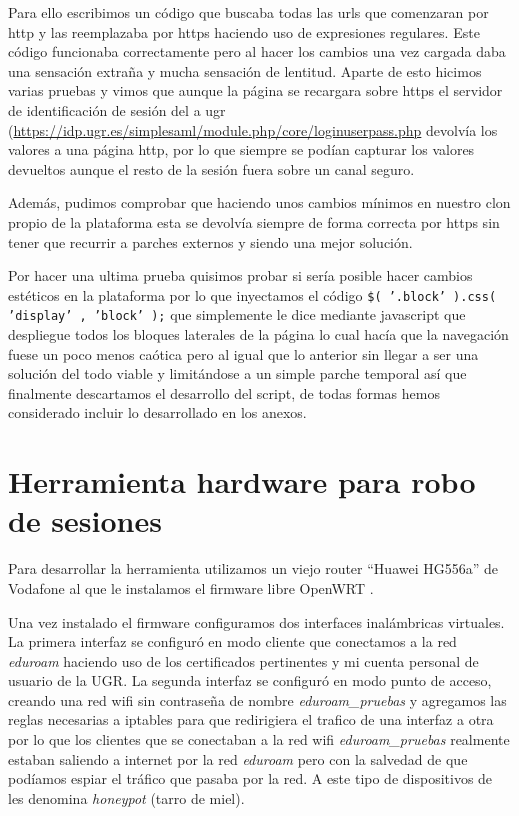 \bigskip
Para ello escribimos un código que buscaba todas las urls que comenzaran por http y las reemplazaba por https haciendo uso de expresiones regulares. Este código funcionaba correctamente pero al hacer los cambios una vez cargada daba una sensación extraña y mucha sensación de lentitud. Aparte de esto hicimos varias pruebas y vimos que aunque la página se recargara sobre https el servidor de identificación de sesión del a ugr (\url{https://idp.ugr.es/simplesaml/module.php/core/loginuserpass.php} devolvía los valores a una página http, por lo que siempre se podían capturar los valores devueltos aunque el resto de la sesión fuera sobre un canal seguro.

\bigskip
Además, pudimos comprobar que haciendo unos cambios mínimos en nuestro clon propio de la plataforma esta se devolvía siempre de forma correcta por https sin tener que recurrir a parches externos y siendo una mejor solución.

\bigskip
Por hacer una ultima prueba quisimos probar si sería posible hacer cambios estéticos en la plataforma por lo que inyectamos el código \texttt{\$( '.block' ).css( 'display' , 'block' );} que simplemente le dice mediante javascript que despliegue todos los bloques laterales de la página lo cual hacía que la navegación fuese un poco menos caótica pero al igual que lo anterior sin llegar a ser una solución del todo viable y limitándose a un simple parche temporal así que finalmente descartamos el desarrollo del script, de todas formas hemos considerado incluir lo desarrollado en los anexos.


\section{Herramienta hardware para robo de sesiones}

Para desarrollar la herramienta utilizamos un viejo router ``Huawei HG556a'' de Vodafone al que le instalamos el firmware libre OpenWRT \cite{openwrt}.

\bigskip
Una vez instalado el firmware configuramos dos interfaces inalámbricas virtuales. La primera interfaz se configuró en modo cliente que conectamos a la red \textit{eduroam} haciendo uso de los certificados pertinentes y mi cuenta personal de usuario de la UGR. La segunda interfaz se configuró en modo punto de acceso, creando una red wifi sin contraseña de nombre \textit{eduroam\_pruebas} y agregamos las reglas necesarias a iptables para que redirigiera el trafico de una interfaz a otra por lo que los clientes que se conectaban a la red wifi \textit{eduroam\_pruebas} realmente estaban saliendo a internet por la red \textit{eduroam} pero con la salvedad de que podíamos espiar el tráfico que pasaba por la red. A este tipo de dispositivos de les denomina \textit{honeypot} (tarro de miel).

